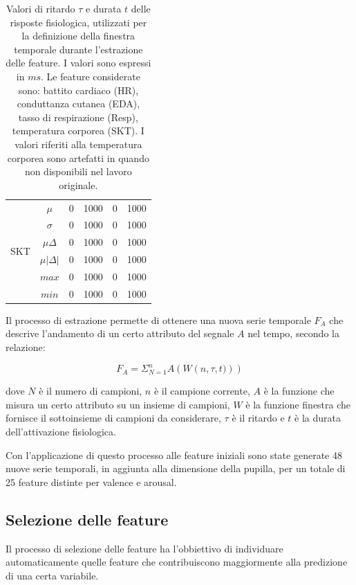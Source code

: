 \begin{table}[]
\begin{tabular}{|c|c|cc|cc|}
\hline
\multirow{6}{*}{SKT} & $\mu$                      & 0    & 1000 & 0    & 1000 \\
                     & $\sigma$                   & 0    & 1000 & 0    & 1000 \\
                     & $\mu\Delta$                & 0    & 1000 & 0    & 1000 \\
                     & $\mu\left|\Delta\right|$   & 0    & 1000 & 0    & 1000 \\
                     & $max$                      & 0    & 1000 & 0    & 1000 \\
                     & $min$                      & 0    & 1000 & 0    & 1000 \\
\hline
\end{tabular}%
\caption{Valori di ritardo $\tau$ e durata $t$ delle risposte fisiologica, utilizzati per la definizione della finestra temporale durante l'estrazione delle feature. I valori sono espressi in $ms$. Le feature considerate sono: battito cardiaco (HR), conduttanza cutanea (EDA), tasso di respirazione (Resp), temperatura corporea (SKT). I valori riferiti alla temperatura corporea sono artefatti in quando non disponibili nel lavoro originale.}
\label{tab:async_window_values}
\end{table}

Il processo di estrazione permette di ottenere una nuova serie temporale $F_A$ che descrive l'andamento di un certo attributo del segnale $A$ nel tempo, secondo la relazione:

\begin{equation}
F_A = \Sigma_{N=1}^{n}A\left(W\left(n,\tau,t)\right)\right)
\end{equation}

dove $N$ è il numero di campioni, $n$ è il campione corrente, $A$ è la funzione che misura un certo attributo su un insieme di campioni, $W$ è la funzione finestra che fornisce il sottoinsieme di campioni da considerare, $\tau$ è il ritardo e $t$ è la durata dell'attivazione fisiologica.

Con l'applicazione di questo processo alle feature iniziali sono state generate 48 nuove serie temporali, in aggiunta alla dimensione della pupilla, per un totale di 25 feature distinte per valence e arousal.

\subsection{Selezione delle feature}
Il processo di selezione delle feature ha l'obbiettivo di individuare automaticamente quelle feature che contribuiscono maggiormente alla predizione di una certa variabile.

